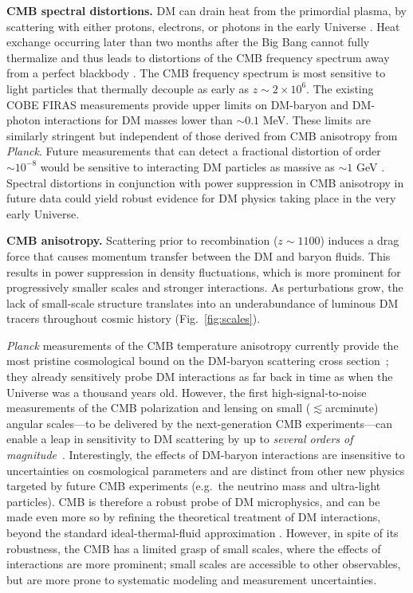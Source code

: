 \documentclass[12pt]{article}
\begin{document}
\textbf{CMB spectral distortions.} 
DM can drain heat from the primordial plasma, by scattering with either protons, electrons, or photons in the early Universe \cite{AliHaimoud_15}.
Heat exchange occurring later than two months after the Big Bang cannot fully thermalize and thus leads to distortions of the CMB frequency spectrum away from a perfect blackbody \cite{Hu_96,2012MNRAS.419.1294C}.  
The CMB frequency spectrum is most sensitive to light particles that thermally decouple as early as $z \sim 2 \times 10^6$.
The existing COBE FIRAS measurements provide upper limits on DM-baryon and DM-photon interactions for DM masses lower than $\sim 0.1$ MeV. 
These limits are similarly stringent but independent of those derived from CMB anisotropy from \textit{Planck}.
Future measurements that can detect a fractional distortion of order $\sim 10^{-8}$ would be sensitive to interacting DM particles as massive as $\sim 1$ GeV \cite{AliHaimoud_15}. 
Spectral distortions in conjunction with power suppression in CMB anisotropy in future data could yield robust evidence for DM physics taking place in the very early Universe.

\textbf{CMB anisotropy.} 
Scattering prior to recombination ($z\sim 1100$) induces a drag force that causes momentum transfer between the DM and baryon fluids. 
This results in power suppression in density fluctuations, which is more prominent for progressively smaller scales and stronger interactions.
As perturbations grow, the lack of small-scale structure translates into an underabundance of luminous DM tracers throughout cosmic history (Fig.~\ref{fig:scales}).

\textit{Planck} measurements of the CMB temperature anisotropy currently provide the most pristine cosmological bound on the DM-baryon scattering cross section~\cite{Boddy:2018kfv,Gluscevic:2017ywp,Boddy:2018wzy,Xu:2018efh,Slatyer:2018aqg,Dvorkin:2013cea}; they already sensitively probe DM interactions as far back in time as when the Universe was a thousand years old.
However, the first high-signal-to-noise measurements of the CMB polarization and lensing on small ($\lesssim$arcminute) angular scales---to be delivered by the next-generation CMB experiments---can enable a leap in sensitivity to DM scattering by up to \textit{several orders of magnitude}~\cite{2018PhRvD..98l3524L,2018arXiv180807445T,Abazajian:2016yjj,2019arXiv190210541H}.
Interestingly, the effects of DM-baryon interactions are insensitive to uncertainties on cosmological parameters and are distinct from other new physics targeted by future CMB experiments (e.g.~the neutrino mass and ultra-light particles). 
CMB is therefore a robust probe of DM microphysics, and can be made even more so by refining the theoretical treatment of DM interactions, beyond the standard ideal-thermal-fluid approximation \cite{AliHaimoud_19}.
However, in spite of its robustness, the CMB has a limited grasp of small scales, where the effects of interactions are more prominent; small scales are accessible to other observables, but are more prone to systematic modeling and measurement uncertainties.
\end{document}
